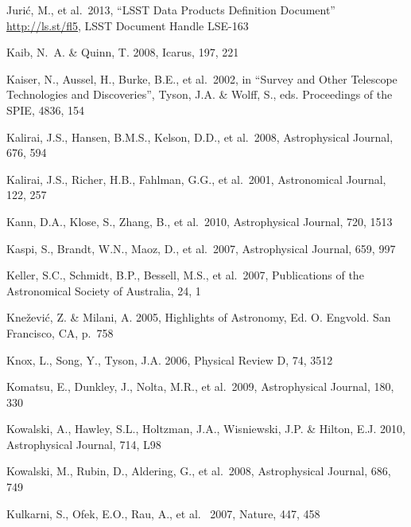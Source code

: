\documentclass{emulateapj}
\begin{document}
\begin{thebibliography}{}
\bibitem[()]{} Juri\'{c}, M., et al.~2013, ``LSST Data Products Definition Document'' \url{http://ls.st/fl5}, LSST Document Handle LSE-163

\bibitem[()]{} Kaib, N.~A. \& Quinn, T. 2008, Icarus, 197, 221 

\bibitem[()]{} Kaiser, N., Aussel, H., Burke, B.E., et al.~2002, in ``Survey and Other Telescope 
             Technologies and Discoveries'', Tyson, J.A. \& Wolff, S.,
             eds. Proceedings of the SPIE, 4836, 154 

\bibitem[()]{} Kalirai, J.S., Hansen, B.M.S., Kelson, D.D., et al.~2008, Astrophysical Journal, 676, 594

\bibitem[()]{} Kalirai, J.S., Richer, H.B., Fahlman, G.G., et al.~2001, Astronomical Journal, 122, 257
	

\bibitem[()]{} Kann, D.A., Klose, S., Zhang, B., et al.~2010, Astrophysical Journal, 720, 1513 
 

\bibitem[()]{} Kaspi, S., Brandt, W.N., Maoz, D., et al.~2007, Astrophysical Journal, 659, 997

\bibitem[()]{} Keller, S.C., Schmidt, B.P., Bessell, M.S., et al.~2007, Publications of the Astronomical 
             Society of Australia, 24, 1

\bibitem[()]{} Kne\v{z}evi\'{c}, Z. \& Milani, A. 2005, Highlights of Astronomy, Ed. O. Engvold. San 
             Francisco, CA, p.~758

\bibitem[()]{} Knox, L., Song, Y., Tyson, J.A. 2006, Physical Review D, 74, 3512 

\bibitem[()]{} Komatsu, E., Dunkley, J., Nolta, M.R., et al.~2009, Astrophysical Journal, 180, 330 
	

\bibitem[()]{} Kowalski, A., Hawley, S.L., Holtzman, J.A., Wisniewski, J.P. \& Hilton, E.J. 2010, Astrophysical Journal, 714, L98

\bibitem[()]{} Kowalski, M., Rubin, D., Aldering, G., et al.~2008,  Astrophysical Journal, 686, 749

\bibitem[()]{} Kulkarni, S., Ofek, E.O., Rau, A., et al.~ 2007, Nature, 447, 458


\end{thebibliography}
\end{document}
